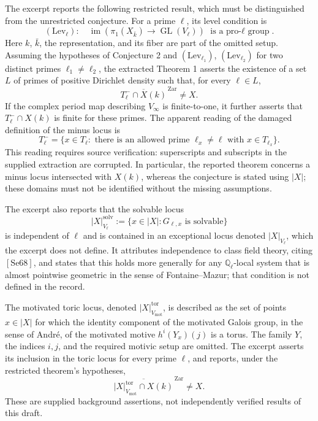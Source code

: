 \documentclass[11pt]{article}
\newcommand{\Q}{\mathbb{Q}}
\begin{document}
The excerpt reports the following restricted result, which must be distinguished from the unrestricted conjecture. For a prime \(\ell\), its level condition is
\[
(\mathrm{Lev}_\ell):\quad
\operatorname{im}\!\left(\pi_1(X_{\bar k})\longrightarrow
\operatorname{GL}(V_\ell)\right)
\text{ is a pro-\(\ell\) group}.
\]
Here \(k\), \(\bar k\), the representation, and its fiber are part of the omitted setup. Assuming the hypotheses of Conjecture 2 and \((\mathrm{Lev}_{\ell_1})\), \((\mathrm{Lev}_{\ell_2})\) for two distinct primes \(\ell_1\ne\ell_2\), the extracted Theorem 1 asserts the existence of a set \(L\) of primes of positive Dirichlet density such that, for every \(\ell\in L\),
\[
\overline{T_\ell^{-}\cap X(k)}^{\,\mathrm{Zar}}\ne X.
\]
If the complex period map describing \(V_\infty\) is finite-to-one, it further asserts that \(T_\ell^{-}\cap X(k)\) is finite for these primes. The apparent reading of the damaged definition of the minus locus is
\[
T_\ell^{-}=\{x\in T_\ell:\text{ there is an allowed prime }\ell_x\ne\ell
\text{ with }x\in T_{\ell_x}\}.
\]
This reading requires source verification: superscripts and subscripts in the supplied extraction are corrupted. In particular, the reported theorem concerns a minus locus intersected with \(X(k)\), whereas the conjecture is stated using \(|X|\); these domains must not be identified without the missing assumptions.

The excerpt also reports that the solvable locus
\[
|X|^{\mathrm{solv}}_{V_\ell}
:=\{x\in|X|:G_{\ell,x}\text{ is solvable}\}
\]
is independent of \(\ell\) and is contained in an exceptional locus denoted \(|X|_{V_\ell}\), which the excerpt does not define. It attributes independence to class field theory, citing \([\mathrm{Se68}]\), and states that this holds more generally for any \(\Q_\ell\)-local system that is almost pointwise geometric in the sense of Fontaine--Mazur; that condition is not defined in the record.

The motivated toric locus, denoted \(|X|^{\mathrm{tor}}_{V_{\mathrm{mot}}}\), is described as the set of points \(x\in|X|\) for which the identity component of the motivated Galois group, in the sense of Andr\'e, of the motivated motive \(h^i(Y_x)(j)\) is a torus. The family \(Y\), the indices \(i,j\), and the required motivic setup are omitted. The excerpt asserts its inclusion in the toric locus for every prime \(\ell\), and reports, under the restricted theorem's hypotheses,
\[
\overline{|X|^{\mathrm{tor}}_{V_{\mathrm{mot}}}\cap X(k)}^{\,\mathrm{Zar}}\ne X.
\]
These are supplied background assertions, not independently verified results of this draft.
\end{document}
